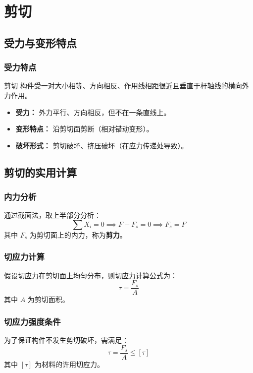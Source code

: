 \chapter{剪切}

\section{受力与变形特点}

\subsection{受力特点}
\begin{mydefinition}{剪切}
构件受一对大小相等、方向相反、作用线相距很近且垂直于杆轴线的横向外力作用。
\begin{itemize}
    \item \textbf{受力：} 外力平行、方向相反，但不在一条直线上。
    \item \textbf{变形特点：} 沿剪切面剪断（相对错动变形）。
    \item \textbf{破坏形式：} 剪切破坏、挤压破坏（在应力传递处导致）。
\end{itemize}
\end{mydefinition}

\section{剪切的实用计算}

\subsection{内力分析}
通过截面法，取上半部分分析：
\begin{equation}
    \sum X_i = 0 \implies F - F_s = 0 \implies F_s = F
\end{equation}
其中 $F_s$ 为剪切面上的内力，称为\textbf{剪力}。

\subsection{切应力计算}
假设切应力在剪切面上均匀分布，则切应力计算公式为：
\begin{equation}
    \tau = \frac{F_s}{A}
\end{equation}
其中 $A$ 为剪切面积。

\subsection{切应力强度条件}
为了保证构件不发生剪切破坏，需满足：
\begin{equation}
    \tau = \frac{F_s}{A} \le [\tau]
\end{equation}
其中 $[\tau]$ 为材料的许用切应力。

